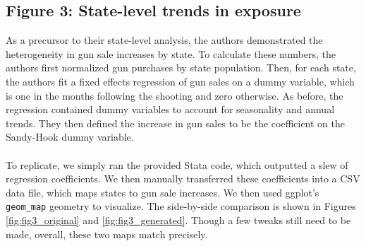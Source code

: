 \documentclass[12pt]{article}%
\begin{document}
\subsection*{Figure 3: State-level trends in exposure}
As a precursor to their state-level analysis, the authors demonstrated the heterogeneity in gun sale increases by state. To calculate these numbers, the authors first normalized gun purchases by state population. Then, for each state, the authors fit a fixed effects regression of gun sales on a dummy variable, which is one in the months following the shooting and zero otherwise. As before, the regression contained dummy variables to account for seasonality and annual trends. They then defined the increase in gun sales to be the coefficient on the Sandy-Hook dummy variable. \\ \\
To replicate, we simply ran the provided Stata code, which outputted a slew of regression coefficients. We then manually transferred these coefficients into a CSV data file, which maps states to gun sale increases. We then used ggplot's \texttt{geom\_map} geometry to visualize. The side-by-side comparison is shown in Figures \ref{fig:fig3_original} and \ref{fig:fig3_generated}. Though a few tweaks still need to be made, overall, these two maps match precisely. 
\end{document}
